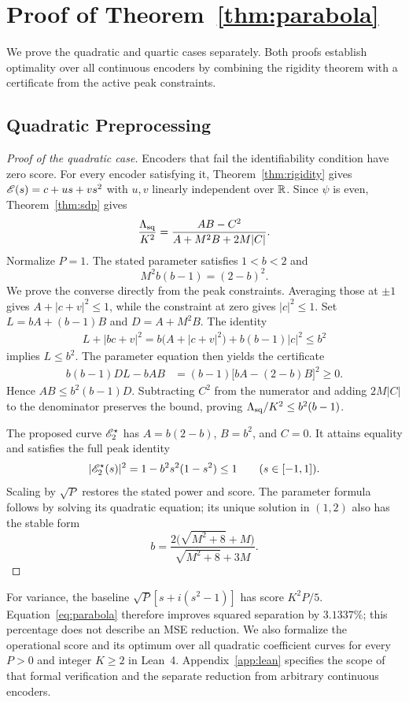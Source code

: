 \section{Proof of Theorem~\ref{thm:parabola}}\label{app:quartic-proof}

We prove the quadratic and quartic cases separately. Both proofs establish optimality over all continuous encoders by combining the rigidity theorem with a certificate from the active peak constraints.

\subsection{Quadratic Preprocessing}\label{app:quadratic-proof}
\begin{proof}[Proof of the quadratic case]
Encoders that fail the identifiability condition have zero score. For every encoder satisfying it, Theorem~\ref{thm:rigidity} gives $\mathscr E(s)=c+us+vs^2$ with $u,v$ linearly independent over $\mathbb R$. Since $\psi$ is even, Theorem~\ref{thm:sdp} gives
$$
 \frac{\Lambda_{\mathrm{sq}}}{K^2}
 =\frac{AB-C^2}{A+M^2B+2M|C|}.
$$
Normalize $P=1$. The stated parameter satisfies $1<b<2$ and
$$M^2b(b-1)=(2-b)^2.$$
We prove the converse directly from the peak constraints. Averaging those at $\pm1$ gives $A+|c+v|^2\le1$, while the constraint at zero gives $|c|^2\le1$. Set $L=bA+(b-1)B$ and $D=A+M^2B$. The identity
\begin{align*}
 L+|bc+v|^2
 =b\bigl(A+|c+v|^2\bigr)+b(b-1)|c|^2\le b^2
\end{align*}
implies $L\le b^2$. The parameter equation then yields the certificate
\begin{align*}
 b(b-1)DL-bAB
 &=(b-1)\bigl[bA-(2-b)B\bigr]^2\ge0.
\end{align*}
Hence $AB\le b^2(b-1)D$. Subtracting $C^2$ from the numerator and adding $2M|C|$ to the denominator preserves the bound, proving $\Lambda_{\mathrm{sq}}/K^2\le b^2(b-1)$.

The proposed curve $\mathscr E_2^\star$ has $A=b(2-b)$, $B=b^2$, and $C=0$. It attains equality and satisfies the full peak identity
$$
 |\mathscr E_2^\star(s)|^2=1-b^2s^2(1-s^2)\le1\qquad(s\in[-1,1]).
$$
Scaling by $\sqrt P$ restores the stated power and score. The parameter formula follows by solving its quadratic equation; its unique solution in $(1,2)$ also has the stable form
$$b=\frac{2\bigl(\sqrt{M^2+8}+M\bigr)}{\sqrt{M^2+8}+3M}.$$
\end{proof}

For variance, the baseline $\sqrt P[s+i(s^2-1)]$ has score $K^2P/5$. Equation~\eqref{eq:parabola} therefore improves squared separation by $3.1337\%$; this percentage does not describe an MSE reduction. \ifArxivVersion We also formalize the operational score and its optimum over all quadratic coefficient curves for every $P>0$ and integer $K\ge2$ in Lean~4. Appendix~\ref{app:lean} specifies the scope of that formal verification and the separate reduction from arbitrary continuous encoders.\fi

